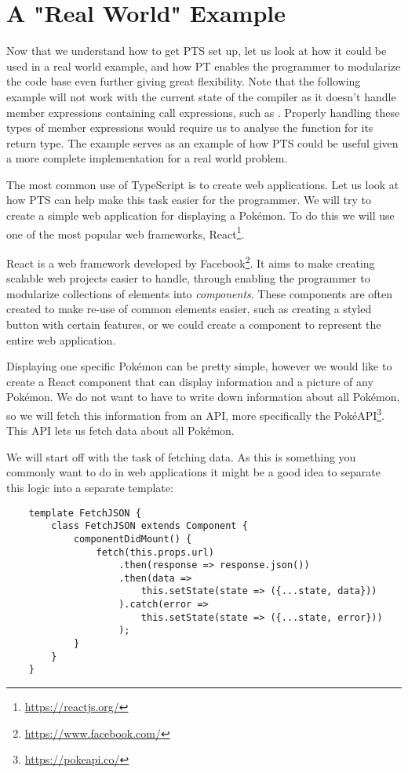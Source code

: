 \section{A "Real World" Example}\label{sec:a-real-world-example}

Now that we understand how to get PTS set up, let us look at how it could be used in a real world example, and how PT enables the programmer to modularize the code base even further giving great flexibility.
Note that the following example will not work with the current state of the compiler as it doesn't handle member expressions containing call expressions, such as .
Properly handling these types of member expressions would require us to analyse the function for its return type.
The example serves as an example of how PTS could be useful given a more complete implementation for a real world problem.

The most common use of TypeScript is to create web applications.
Let us look at how PTS can help make this task easier for the programmer.
We will try to create a simple web application for displaying a Pokémon.
To do this we will use one of the most popular web frameworks, React\footnote{\url{https://reactjs.org/}}.

React is a web framework developed by Facebook\footnote{\url{https://www.facebook.com/}}.
It aims to make creating scalable web projects easier to handle, through enabling the programmer to modularize collections of elements into \emph{components}.
These components are often created to make re-use of common elements easier, such as creating a styled button with certain features, or we could create a component to represent the entire web application.

Displaying one specific Pokémon can be pretty simple, however we would like to create a React component that can display information and a picture of any Pokémon.
We do not want to have to write down information about all Pokémon, so we will fetch this information from an API, more specifically the PokéAPI\footnote{\url{https://pokeapi.co/}}.
This API lets us fetch data about all Pokémon.

We will start off with the task of fetching data.
As this is something you commonly want to do in web applications it might be a good idea to separate this logic into a separate template:

\begin{verbatim}
    template FetchJSON {
        class FetchJSON extends Component {
            componentDidMount() {
                fetch(this.props.url)
                    .then(response => response.json())
                    .then(data =>
                        this.setState(state => ({...state, data}))
                    ).catch(error =>
                        this.setState(state => ({...state, error}))
                    );
            }
        }
    }
\end{verbatim}

